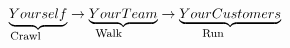 \documentclass[11pt]{article}
\begin{document}
   \begin{equation*}
     \underbrace{Yourself}_{\parbox{4em}{\footnotesize Crawl}} \rightarrow \underbrace{Your Team}_{\parbox{4em}{\footnotesize Walk}} \rightarrow \underbrace{Your Customers}_{\parbox{4em}{\footnotesize Run}}
   \end{equation*}
\end{document}
